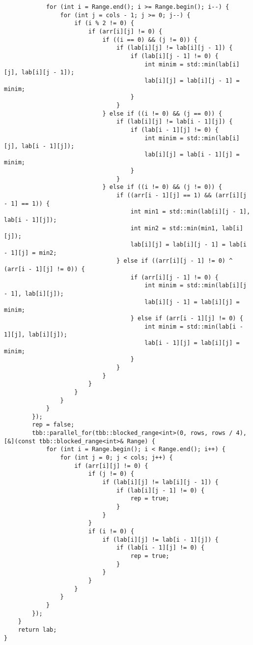 \documentclass{report}
\begin{document}
\begin{lstlisting}
            for (int i = Range.end(); i >= Range.begin(); i--) {
                for (int j = cols - 1; j >= 0; j--) {
                    if (i % 2 != 0) {
                        if (arr[i][j] != 0) {
                            if ((i == 0) && (j != 0)) {
                                if (lab[i][j] != lab[i][j - 1]) {
                                    if (lab[i][j - 1] != 0) {
                                        int minim = std::min(lab[i][j], lab[i][j - 1]);
                                        lab[i][j] = lab[i][j - 1] = minim;
                                    }
                                }
                            } else if ((i != 0) && (j == 0)) {
                                if (lab[i][j] != lab[i - 1][j]) {
                                    if (lab[i - 1][j] != 0) {
                                        int minim = std::min(lab[i][j], lab[i - 1][j]);
                                        lab[i][j] = lab[i - 1][j] = minim;
                                    }
                                }
                            } else if ((i != 0) && (j != 0)) {
                                if ((arr[i - 1][j] == 1) && (arr[i][j - 1] == 1)) {
                                    int min1 = std::min(lab[i][j - 1], lab[i - 1][j]);
                                    int min2 = std::min(min1, lab[i][j]);
                                    lab[i][j] = lab[i][j - 1] = lab[i - 1][j] = min2;
                                } else if ((arr[i][j - 1] != 0) ^ (arr[i - 1][j] != 0)) {
                                    if (arr[i][j - 1] != 0) {
                                        int minim = std::min(lab[i][j - 1], lab[i][j]);
                                        lab[i][j - 1] = lab[i][j] = minim;
                                    } else if (arr[i - 1][j] != 0) {
                                        int minim = std::min(lab[i - 1][j], lab[i][j]);
                                        lab[i - 1][j] = lab[i][j] = minim;
                                    }
                                }
                            }
                        }
                    }
                }
            }
        });
        rep = false;
        tbb::parallel_for(tbb::blocked_range<int>(0, rows, rows / 4), [&](const tbb::blocked_range<int>& Range) {
            for (int i = Range.begin(); i < Range.end(); i++) {
                for (int j = 0; j < cols; j++) {
                    if (arr[i][j] != 0) {
                        if (j != 0) {
                            if (lab[i][j] != lab[i][j - 1]) {
                                if (lab[i][j - 1] != 0) {
                                    rep = true;
                                }   
                            }
                        }
                        if (i != 0) {
                            if (lab[i][j] != lab[i - 1][j]) {
                                if (lab[i - 1][j] != 0) {
                                    rep = true;
                                }   
                            } 
                        }
                    }
                }
            }
        });
    }
    return lab;
}





\end{lstlisting}
\end{document}
